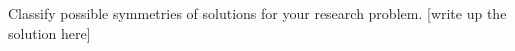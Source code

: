 
{Classify possible symmetries of solutions for your research
problem.}
   {
[write up the solution here]
    } %
